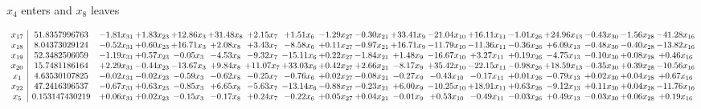 \documentclass[9pt]{article}
\begin{document}
 $ x_{4} $ enters and $ x_{8} $ leaves 

 \[\begin{array}{c| c c@{\hskip 2pt} c@{\hskip 2pt} c@{\hskip 2pt} c@{\hskip 2pt} c@{\hskip 2pt} c@{\hskip 2pt} c@{\hskip 2pt} c@{\hskip 2pt} c@{\hskip 2pt} c@{\hskip 2pt} c@{\hskip 2pt} c@{\hskip 2pt} c@{\hskip 2pt} c@{\hskip 2pt} c@{\hskip 2pt} c@{\hskip 2pt} }
 x_{17}   &  51.8357996763 & -1.81 x_{31} & +  1.83 x_{23} & + 12.86 x_{3} & + 31.48 x_{8} & +  2.15 x_{7} & +  1.51 x_{6} & -1.29 x_{27} & -0.30 x_{21} & + 33.41 x_{9} & -21.04 x_{10} & + 16.11 x_{11} & -1.01 x_{26} & + 24.96 x_{13} & -0.43 x_{30} & -1.56 x_{28} & -41.28 x_{16}\\
 x_{18}   &  8.04373029124 & -0.52 x_{31} & +  0.60 x_{23} & + 16.71 x_{3} & +  2.08 x_{8} & +  3.43 x_{7} & -8.58 x_{6} & +  0.11 x_{27} & -0.97 x_{21} & + 16.71 x_{9} & -11.79 x_{10} & -11.36 x_{11} & -0.36 x_{26} & +  6.09 x_{13} & -0.48 x_{30} & -0.40 x_{28} & -13.82 x_{16}\\
 x_{19}   &  52.3482506059 & -1.19 x_{31} & +  0.57 x_{23} & -0.05 x_{3} & -4.53 x_{8} & -9.32 x_{7} & -15.11 x_{6} & +  0.22 x_{27} & -1.84 x_{21} & +  1.48 x_{9} & -16.67 x_{10} & +  3.27 x_{11} & +  0.19 x_{26} & -4.75 x_{13} & -0.10 x_{30} & +  0.08 x_{28} & +  0.46 x_{16}\\
 x_{20}   &  15.7481186164 & +  2.29 x_{31} & -0.44 x_{23} & -13.67 x_{3} & +  9.84 x_{8} & + 11.07 x_{7} & + 33.03 x_{6} & +  0.42 x_{27} & +  2.66 x_{21} & -8.17 x_{9} & + 35.42 x_{10} & -22.15 x_{11} & -0.98 x_{26} & + 18.59 x_{13} & -0.35 x_{30} & +  0.39 x_{28} & -10.56 x_{16}\\
 x_{1}   &  4.63530107825 & -0.02 x_{31} & -0.02 x_{23} & -0.59 x_{3} & -0.62 x_{8} & -0.25 x_{7} & -0.76 x_{6} & +  0.02 x_{27} & -0.08 x_{21} & -0.27 x_{9} & -0.43 x_{10} & -0.17 x_{11} & +  0.01 x_{26} & -0.79 x_{13} & +  0.02 x_{30} & +  0.04 x_{28} & +  0.67 x_{16}\\
 x_{22}   &  47.2416396537 & -0.67 x_{31} & +  0.63 x_{23} & -0.85 x_{3} & +  6.65 x_{8} & -5.63 x_{7} & -13.14 x_{6} & -0.88 x_{27} & -0.23 x_{21} & +  6.00 x_{9} & -10.25 x_{10} & + 18.91 x_{11} & +  0.63 x_{26} & -9.12 x_{13} & +  0.11 x_{30} & +  0.04 x_{28} & -11.76 x_{16}\\
 x_{5}   &  0.153147430219 & +  0.06 x_{31} & +  0.02 x_{23} & -0.15 x_{3} & -0.17 x_{8} & +  0.24 x_{7} & -0.22 x_{6} & +  0.05 x_{27} & +  0.04 x_{21} & -0.01 x_{9} & +  0.53 x_{10} & -0.49 x_{11} & -0.03 x_{26} & +  0.49 x_{13} & -0.03 x_{30} & +  0.06 x_{28} & +  0.19 x_{16}\\

\end{array}\]
\end{document}
